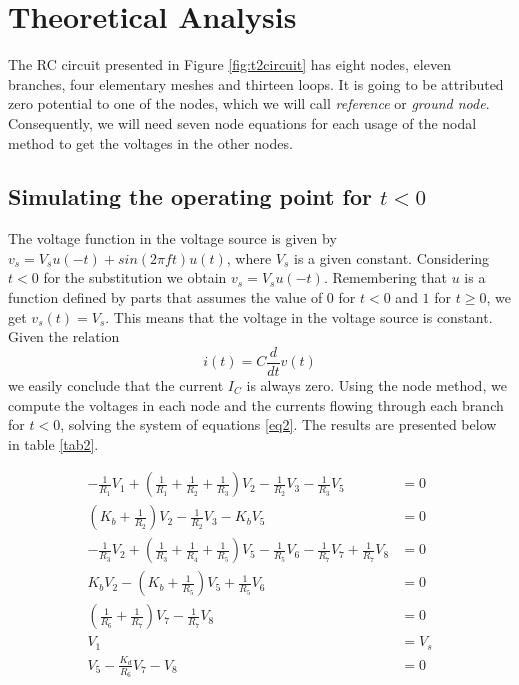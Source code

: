 \section{Theoretical Analysis}
\label{sec:analysis}
The RC circuit presented in Figure \ref{fig:t2circuit} has eight nodes, eleven branches, four elementary meshes and thirteen loops. It is going to be attributed zero potential to one of the nodes, which we will call  \textit{reference} or \textit{ground node}.
Consequently, we will need seven node equations for each usage of the nodal method to get the voltages in the other nodes.

\subsection{Simulating the operating point for $t<0$}\label{sec2.1}

The voltage function in the voltage source is given by $v_s=V_s u(-t)+sin(2\pi ft)u(t)$, where $V_s$ is a given constant. Considering $t<0$ for the substitution we obtain $v_s=V_s u(-t)$. Remembering that $u$ is a function defined by parts that assumes the value of $0$ for $t<0$ and $1$ for $t\geq 0$, we get $v_s(t)=V_s$. This means that the voltage in the voltage source is constant. 
Given the relation 
\begin{equation} \label{eq1}
    i(t)=C \frac{d}{dt}v(t)
\end{equation}
we easily conclude that the current $I_C$ is always zero. 
Using the node method, we compute the voltages in each node and the currents flowing through each branch for $t<0$, solving the system of equations \ref{eq2}. The results are presented below in table \ref{tab2}.

\begin{equation} \label{eq2}
\begin{split}
-\frac{1}{R_1}V_1+\left(\frac{1}{R_1}+\frac{1}{R_2}+\frac{1}{R_3}\right)V_2-\frac{1}{R_2}V_3-\frac{1}{R_3}V_5&=0 \\
\left(K_b+\frac{1}{R_2}\right)V_2-\frac{1}{R_2}V_3-K_b V_5&=0 \\
-\frac{1}{R_3}V_2+\left(\frac{1}{R_3}+\frac{1}{R_4}+\frac{1}{R_5}\right)V_5-\frac{1}{R_5}V_6-\frac{1}{R_7}V_7+\frac{1}{R_7}V_8&=0 \\
K_b V_2-\left(K_b+\frac{1}{R_5}\right)V_5+\frac{1}{R_5}V_6&=0 \\
\left(\frac{1}{R_6}+\frac{1}{R_7}\right)V_7-\frac{1}{R_7}V_8&=0 \\
V_1&=V_s \\ 
V_5-\frac{K_d}{R_6}V_7-V_8&=0 \\   
\end{split}
\end{equation}

